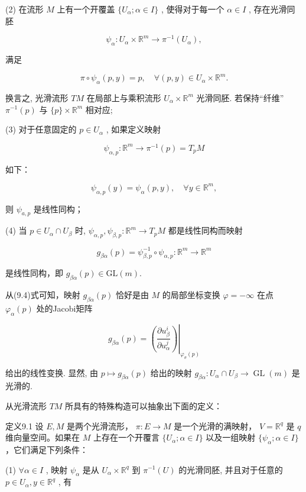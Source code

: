 (2) 在流形  $M$  上有一个开覆盖  $\{U_{\alpha}; \alpha \in I\}$ , 使得对于每一个  $\alpha \in I$ , 存在光滑同胚

$$
\psi_ {\alpha}: U _ {\alpha} \times \mathbb {R} ^ {m} \rightarrow \pi^ {- 1} (U _ {\alpha}),
$$

满足

$$
\pi \circ \psi_ {\alpha} (p, y) = p, \quad \forall (p, y) \in U _ {\alpha} \times \mathbb {R} ^ {m}.
$$

换言之, 光滑流形  $TM$  在局部上与乘积流形  $U_{\alpha} \times \mathbb{R}^{m}$  光滑同胚. 若保持“纤维”  $\pi^{-1}(p)$  与  $\{p\} \times \mathbb{R}^{m}$  相对应;

(3) 对于任意固定的  $p \in U_{\alpha}$ , 如果定义映射

$$
\psi_ {\alpha , p}: \mathbb {R} ^ {m} \rightarrow \pi^ {- 1} (p) = T _ {p} M
$$

如下：

$$
\psi_ {\alpha , p} (y) = \psi_ {\alpha} (p, y), \quad \forall y \in \mathbb {R} ^ {m},
$$

则  $\psi_{a,p}$  是线性同构；

(4) 当  $p \in U_{\alpha} \cap U_{\beta}$  时,  $\psi_{\alpha,p}, \psi_{\beta,p}: \mathbb{R}^{m} \to T_{p}M$  都是线性同构而映射

$$
g _ {\beta \alpha} (p) = \psi_ {\beta , p} ^ {- 1} \circ \psi_ {\alpha , p}: \mathbb {R} ^ {m} \rightarrow \mathbb {R} ^ {m}
$$

是线性同构，即  $g_{\beta \alpha}(p)\in \mathrm{GL}(m).$

从(9.4)式可知，映射  $g_{\beta \alpha}(p)$  恰好是由  $M$  的局部坐标变换  $\varphi = -\infty$  在点  $\varphi_{\alpha}(p)$  处的Jacobi矩阵

$$
g _ {\beta \alpha} (p) = \left. \left(\frac {\partial u _ {\beta} ^ {i}}{\partial u _ {\alpha} ^ {j}}\right) \right| _ {\varphi_ {\sigma} (p)}
$$

给出的线性变换. 显然, 由  $p \mapsto g_{\beta \alpha}(p)$  给出的映射  $g_{\beta \alpha}: U_{\alpha} \cap U_{\beta} \to \operatorname{GL}(m)$  是光滑的.

从光滑流形  $TM$  所具有的特殊构造可以抽象出下面的定义：

定义9.1 设  $E, M$  是两个光滑流形， $\pi : E \to M$  是一个光滑的满映射， $V = \mathbb{R}^q$  是  $q$  维向量空间。如果在  $M$  上存在一个开覆言  $\{U_\alpha; \alpha \in I\}$  以及一组映射  $\{\psi_\alpha; \alpha \in I\}$ ，它们满足下列条件：

(1)  $\forall \alpha \in I$ , 映射  $\psi_{\alpha}$  是从  $U_{\alpha} \times \mathbb{R}^{q}$  到  $\pi^{-1}(U)$  的光滑同胚, 并且对于任意的  $p \in U_{\alpha}, y \in \mathbb{R}^{q}$ , 有

